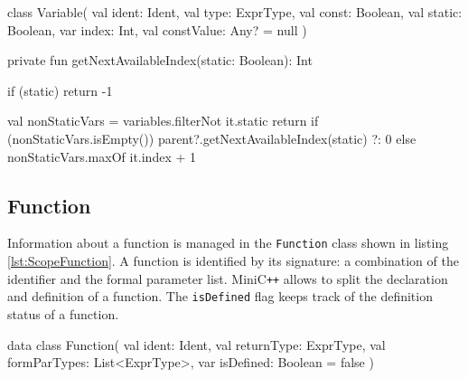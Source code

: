 \begin{KotlinCode}[float,numbers=none,caption=Implementation of the \texttt{Variable} class., label=lst:ScopeVariable]
class Variable(
    val ident: Ident,
    val type: ExprType,
    val const: Boolean,
    val static: Boolean,
    var index: Int,
    val constValue: Any? = null
)
\end{KotlinCode}

\begin{KotlinCode}[float,numbers=none,caption=Implementation of the \texttt{getNextAvailableIndex} method., label=lst:ScopeVariableIndex]
       private fun getNextAvailableIndex(static: Boolean): Int {
              if (static) return -1
              
              val nonStaticVars = variables.filterNot { it.static }
              return if (nonStaticVars.isEmpty()) {
                  parent?.getNextAvailableIndex(static) ?: 0
              } else {
                  nonStaticVars.maxOf { it.index } + 1
              }
          }
\end{KotlinCode}

\subsection{Function}

Information about a function is managed in the \verb|Function| class shown in listing \ref{lst:ScopeFunction}. A function is identified by its signature: a combination of the identifier and the formal parameter list. MiniC\verb|++| allows to split the declaration and definition of a function. The \verb|isDefined| flag keeps track of the definition status of a function.


\begin{KotlinCode}[float,numbers=none,caption=Implementation of the \texttt{Function} class., label=lst:ScopeFunction]
       data class Function(
              val ident: Ident,
              val returnType: ExprType,
              val formParTypes: List<ExprType>,
              var isDefined: Boolean = false
          )
\end{KotlinCode}